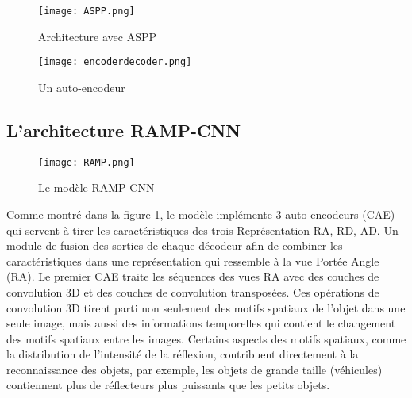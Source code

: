 \begin{figure}[hbt!]
  \centering
  \begin{minipage}[b]{0.5\textwidth}
      \texttt{[image: ASPP.png]}
      \caption{Architecture avec ASPP}
  \end{minipage}
  \begin{minipage}[b]{0.45\textwidth}
    \texttt{[image: encoderdecoder.png]}
    \caption{Un auto-encodeur}
\end{minipage}
\end{figure}
\subsection{L'architecture RAMP-CNN}\label{sec:423}
\begin{figure}[hbt!]
  \centering
  \texttt{[image: RAMP.png]}
  \caption{Le modèle RAMP-CNN \cite{49}}
  \label{fig:43}
\end{figure}
Comme montré dans la figure \ref{fig:43}, le modèle implémente 3 auto-encodeurs (CAE) qui servent à tirer les caractéristiques des trois Représentation RA, RD, AD. Un module de fusion des sorties de chaque décodeur afin de combiner les caractéristiques dans une représentation qui ressemble à la vue Portée Angle (RA). Le premier CAE traite les séquences des vues RA avec des couches de convolution 3D et des couches de convolution transposées. Ces opérations de convolution 3D tirent parti non seulement des motifs spatiaux de l'objet dans une seule image, mais aussi des informations temporelles qui contient le changement des motifs spatiaux entre les images. Certains aspects des motifs spatiaux, comme la distribution de l'intensité de la réflexion, contribuent directement à la reconnaissance des objets, par exemple, les objets de grande taille (véhicules) contiennent plus de réflecteurs plus puissants que les petits objets.

